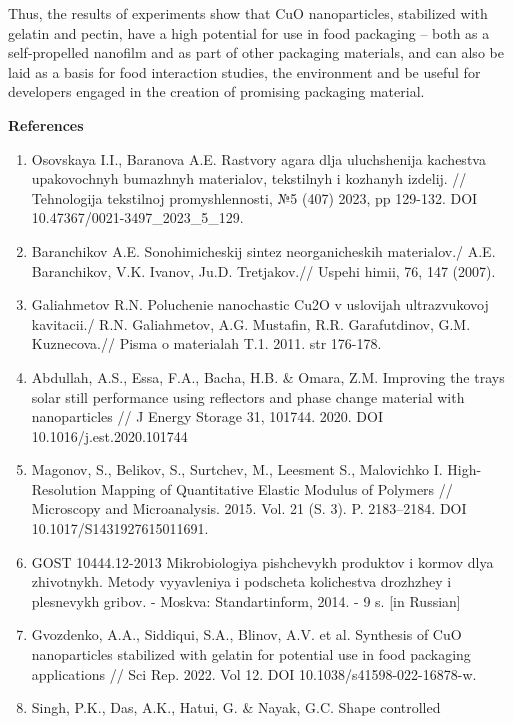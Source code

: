 Thus, the results of experiments show that CuO nanoparticles, stabilized
with gelatin and pectin, have a high potential for use in food packaging
-- both as a self-propelled nanofilm and as part of other packaging
materials, and can also be laid as a basis for food interaction studies,
the environment and be useful for developers engaged in the creation of
promising packaging material.

{\bfseries References}

\begin{enumerate}
\def\labelenumi{\arabic{enumi}.}
\item
  Osovskaya I.I., Baranova A.E. Rastvory agara dlja uluchshenija
  kachestva upakovochnyh bumazhnyh materialov,
  tekstil\textquotesingle nyh i kozhanyh izdelij. // Tehnologija
  tekstil\textquotesingle\textquotesingle noj promyshlennosti, №5 (407)
  2023, pp 129-132. DOI 10.47367/0021-3497\_2023\_5\_129.
\item
  Baranchikov A.E. Sonohimicheskij sintez neorganicheskih materialov./
  A.E. Baranchikov, V.K. Ivanov, Ju.D. Tret\textquotesingle jakov.//
  Uspehi himii, 76, 147 (2007).
\item
  Galiahmetov R.N. Poluchenie nanochastic Cu2O v uslovijah
  ul\textquotesingle trazvukovoj kavitacii./ R.N. Galiahmetov, A.G.
  Mustafin, R.R. Garafutdinov, G.M. Kuznecova.// Pis\textquotesingle ma
  o materialah T.1. 2011. str 176-178.
\item
  Abdullah, A.S., Essa, F.A., Bacha, H.B. \& Omara, Z.M. Improving the
  trays solar still performance using reflectors and phase change
  material with nanoparticles // J Energy Storage 31, 101744. 2020. DOI
  10.1016/j.est.2020.101744
\item
  Magonov, S., Belikov, S., Surtchev, M., Leesment S., Malovichko I.
  High-Resolution Mapping of Quantitative Elastic Modulus of Polymers //
  Microscopy and Microanalysis. 2015. Vol. 21 (S. 3). P. 2183--2184. DOI
  10.1017/S1431927615011691.
\item
  GOST 10444.12-2013 Mikrobiologiya pishchevykh produktov i kormov dlya
  zhivotnykh. Metody vyyavleniya i podscheta kolichestva drozhzhey i
  plesnevykh gribov. - Moskva: Standartinform, 2014. - 9 s. {[}in
  Russian{]}
\item
  Gvozdenko, A.A., Siddiqui, S.A., Blinov, A.V. et al. Synthesis of CuO
  nanoparticles stabilized with gelatin for potential use in food
  packaging applications // Sci Rep. 2022. Vol 12. DOI
  10.1038/s41598-022-16878-w.
\item
  Singh, P.K., Das, A.K., Hatui, G. \& Nayak, G.C. Shape controlled

\end{enumerate}
